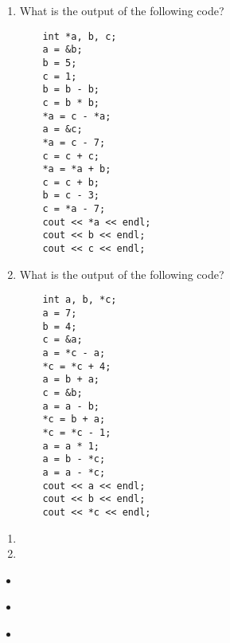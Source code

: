 
\begin{enumerate}
	\item What is the output of the following code?
  \begin{lstlisting}
	int *a, b, c;
	a = &b;
	b = 5;
	c = 1;
	b = b - b;
	c = b * b;
	*a = c - *a;
	a = &c;
	*a = c - 7;
	c = c + c;
	*a = *a + b;
	c = c + b;
	b = c - 3;
	c = *a - 7;
	cout << *a << endl;
	cout << b << endl;
	cout << c << endl;
	\end{lstlisting}
	\item What is the output of the following code?
  \begin{lstlisting}
	int a, b, *c;
	a = 7;
	b = 4;
	c = &a;
	a = *c - a;
	*c = *c + 4;
	a = b + a;
	c = &b;
	a = a - b;
	*c = b + a;
	*c = *c - 1;
	a = a * 1;
	a = b - *c;
	a = a - *c;
	cout << a << endl;
	cout << b << endl;
	cout << *c << endl;
	\end{lstlisting}
\end{enumerate}



\begin{enumerate}
	\item {}



	\item {}


\end{enumerate}



\begin{itemize}
\item ~
\item ~
\item ~
\end{itemize}	
